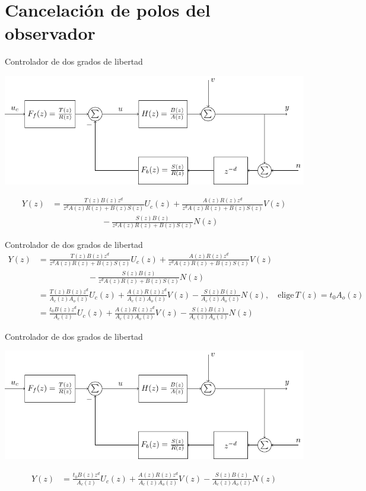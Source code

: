 \documentclass[presentation,aspectratio=169]{beamer}
\begin{document}
\section{Cancelación de polos del observador}
\label{sec:orgc7ba599}
\begin{frame}[label={sec:org0dbc2b1}]{Controlador de dos grados de libertad}
\begin{center}
\includegraphics[width=0.7\linewidth]{../../figures/2dof-block-explicit}
\end{center}

\begin{align*}
Y(z) &= \frac{T(z)B(z)z^d}{z^dA(z)R(z) + B(z)S(z)}U_c(z) + \frac{A(z)R(z)z^d}{z^dA(z)R(z) + B(z)S(z)}V(z)\\ & \qquad\qquad\qquad - \frac{S(z)B(z)}{z^dA(z)R(z) + B(z)S(z)}N(z)
\end{align*}
\end{frame}




\begin{frame}[label={sec:org4aeb684}]{Controlador de dos grados de libertad}
\begin{align*}
Y(z) &= \frac{T(z)B(z)z^d}{z^dA(z)R(z) + B(z)S(z)}U_c(z) + \frac{A(z)R(z)z^d}{z^dA(z)R(z) + B(z)S(z)}V(z)\\ & \qquad\qquad\qquad - \frac{S(z)B(z)}{z^dA(z)R(z) + B(z)S(z)}N(z)\\
     &= \frac{T(z)B(z)z^d}{A_c(z)A_o(z)}U_c(z) + \frac{A(z)R(z)z^d}{A_c(z)A_o(z)}V(z)- \frac{S(z)B(z)}{A_c(z)A_o(z)}N(z), \quad \text{elige}\, T(z) = t_0A_o(z)\\
     &= \frac{t_0B(z)z^d}{A_c(z)}U_c(z) + \frac{A(z)R(z)z^d}{A_c(z)A_o(z)}V(z)- \frac{S(z)B(z)}{A_c(z)A_o(z)}N(z)
\end{align*}
\end{frame}

\begin{frame}[label={sec:org064e1dd}]{Controlador de dos grados de libertad}
\begin{center}
\includegraphics[width=0.7\linewidth]{../../figures/2dof-block-explicit}
\end{center}
\begin{align*}
Y(z) &= \frac{t_0B(z)z^d}{A_c(z)}U_c(z) + \frac{A(z)R(z)z^d}{A_c(z)A_o(z)}V(z)- \frac{S(z)B(z)}{A_c(z)A_o(z)}N(z)
\end{align*}
\end{frame}
\end{document}
